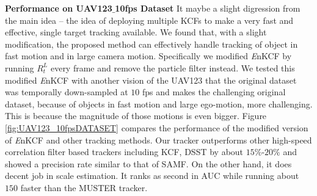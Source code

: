 \documentclass[10pt,twocolumn,letterpaper]{article}
\begin{document}

\textbf{Performance on UAV123$\_$10fps Dataset} It maybe a slight
digression from the main idea -- the idea of deploying multiple KCFs
to make a very fast and effective, single target tracking
available. We found that, with a slight modification, the proposed
method can effectively handle tracking of object in fast motion and in
large camera motion. Specifically we modified {\it E}nKCF by running
$R_{t}^{L}$ every frame and remove the particle filter instead. We
tested this modified {\it E}nKCF with another vision of the UAV123 that
the original dataset was temporally down-sampled at $10$ fps and makes
the challenging original dataset, because of objects in fast motion
and large ego-motion, more challenging. This is because the magnitude
of those motions is even bigger. Figure \ref{fig:UAV123_10fpsDATASET}
compares the performance of the modified version of {\it E}nKCF and
other tracking methods. Our tracker outperforms other high-speed
correlation filter based trackers including KCF, DSST by about
$15\%$-$20\%$ and showed a precision rate similar to that of SAMF. On
the other hand, it does decent job in scale estimation. It ranks as
second in AUC while running about $150$ faster than the MUSTER
tracker.
\end{document}
